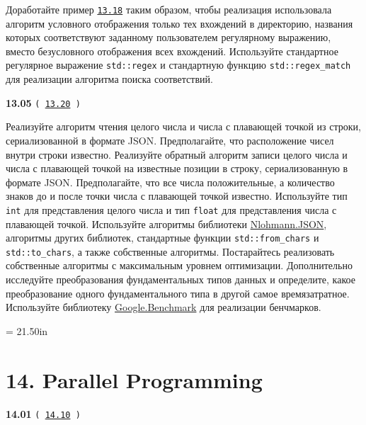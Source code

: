 \documentclass[a4paper,12pt]{article}
\begin{document}
\bigskip

Доработайте пример \href{https://github.com/i-s-m-mipt/Education/blob/master/projects/examples/source/13.18.cpp}{\texttt{13.18}} таким образом, чтобы реализация использовала алгоритм условного отображения только тех вхождений в директорию, названия которых соответствуют заданному пользователем регулярному выражению, вместо безусловного отображения всех вхождений. Используйте стандартное регулярное выражение \lstinline{std::regex} и стандартную функцию \lstinline{std::regex_match} для реализации алгоритма поиска соответствий.

\bigskip

{\large \textbf{13.05} \texttt{(\,\href{https://github.com/i-s-m-mipt/Education/blob/master/projects/examples/source/13.20.cpp}{13.20}\,)}}

\bigskip

Реализуйте алгоритм чтения целого числа и числа с плавающей точкой из строки, сериализованной в формате JSON. Предполагайте, что расположение чисел внутри строки известно. Реализуйте обратный алгоритм записи целого числа и числа с плавающей точкой на известные позиции в строку, сериализованную в формате JSON. Предполагайте, что все числа положительные, а количество знаков до и после точки числа с плавающей точкой известно. Используйте тип \lstinline{int} для представления целого числа и тип \lstinline{float} для представления числа с плавающей точкой. Используйте алгоритмы библиотеки \href{https://github.com/nlohmann/json}{Nlohmann.JSON}, алгоритмы других библиотек, стандартные функции \lstinline{std::from_chars} и \lstinline{std::to_chars}, а также собственные алгоритмы. Постарайтесь реализовать собственные алгоритмы с максимальным уровнем оптимизации. Дополнительно исследуйте преобразования фундаментальных типов данных и определите, какое преобразование одного фундаментального типа в другой самое времязатратное. Используйте библиотеку \href{https://github.com/google/benchmark}{Google.Benchmark} для реализации бенчмарков.



\newpage\thispagestyle{empty}\pdfpageheight = 21.50in\enlargethispage{100in}

\section{14. Parallel Programming}

{\large \textbf{14.01} \texttt{(\,\href{https://github.com/i-s-m-mipt/Education/blob/master/projects/examples/source/14.10.cpp}{14.10}\,)}}
\end{document}
